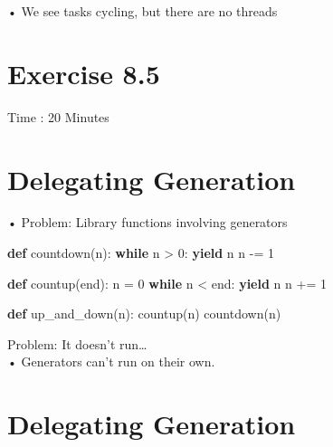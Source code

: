 \documentclass[
  letterpaper,
  DIV=11,
  numbers=noendperiod]{scrreprt}
\newenvironment{Shaded}{\begin{snugshade}}{\end{snugshade}}
\newcommand{\ControlFlowTok}[1]{\textcolor[rgb]{0.00,0.23,0.31}{\textbf{#1}}}
\newcommand{\DecValTok}[1]{\textcolor[rgb]{0.68,0.00,0.00}{#1}}
\newcommand{\KeywordTok}[1]{\textcolor[rgb]{0.00,0.23,0.31}{\textbf{#1}}}
\newcommand{\NormalTok}[1]{\textcolor[rgb]{0.00,0.23,0.31}{#1}}
\newcommand{\OperatorTok}[1]{\textcolor[rgb]{0.37,0.37,0.37}{#1}}
\begin{document}
• We see tasks cycling, but there are no threads


\chapter{Exercise 8.5}\label{exercise-8.5}

Time : 20 Minutes


\chapter{Delegating Generation}\label{delegating-generation}

• Problem: Library functions involving generators

\begin{Shaded}
\begin{Highlighting}[]
\KeywordTok{def}\NormalTok{ countdown(n):}
    \ControlFlowTok{while}\NormalTok{ n }\OperatorTok{\textgreater{}} \DecValTok{0}\NormalTok{:}
        \ControlFlowTok{yield}\NormalTok{ n}
\NormalTok{        n }\OperatorTok{{-}=} \DecValTok{1} 
\end{Highlighting}
\end{Shaded}

\begin{Shaded}
\begin{Highlighting}[]
\KeywordTok{def}\NormalTok{ countup(end): n }\OperatorTok{=} \DecValTok{0} \ControlFlowTok{while}\NormalTok{ n }\OperatorTok{\textless{}}\NormalTok{ end: }\ControlFlowTok{yield}\NormalTok{ n n }\OperatorTok{+=} \DecValTok{1} 
\end{Highlighting}
\end{Shaded}

\begin{Shaded}
\begin{Highlighting}[]
\KeywordTok{def}\NormalTok{ up\_and\_down(n):}
\NormalTok{    countup(n)}
\NormalTok{    countdown(n) }
\end{Highlighting}
\end{Shaded}

Problem: It doesn't run\ldots{}\\
• Generators can't run on their own.


\chapter{Delegating Generation}\label{delegating-generation-1}
\end{document}
